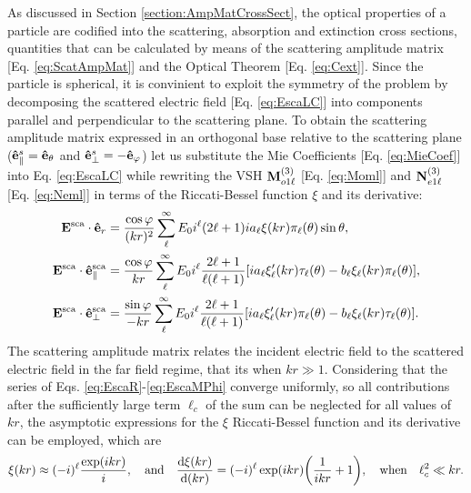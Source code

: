 As discussed in Section \ref{section:AmpMatCrossSect}, the optical properties of a particle are codified into the scattering, absorption and extinction cross sections, quantities that can be calculated by means of the scattering amplitude matrix [Eq. \eqref{eq:ScatAmpMat}] and the Optical Theorem [Eq. \eqref{eq:Cext}]. Since the particle is spherical, it is convinient to exploit the symmetry of the problem  by decomposing the scattered electric field [Eq. \eqref{eq:EscaLC}] into components parallel and perpendicular to the scattering plane. To obtain the scattering amplitude matrix  expressed in an orthogonal base relative to the scattering plane ($\vu{e}_\parallel^s =\vu{e}_\theta$ and $\vu{e}_\perp^s=-\vu{e}_\varphi$) let us substitute the Mie Coefficients [Eq. \eqref{eq:MieCoef}] into Eq. \eqref{eq:EscaLC}  while rewriting the VSH $\vb{M}^{(3)}_{o1\ell}$  [Eq. \eqref{eq:Moml}] and $\vb{N}^{(3)}_{e1\ell}$ [Eq. \eqref{eq:Neml}] in terms of the Riccati-Bessel function  $\xi$ and its derivative:
%
\begin{align}
\vb{E}^\text{sca}\cdot\vu{e}_r &=  \frac{\cos\varphi}{(kr)^2}
								\sum_\ell^\infty E_0i^\ell(2\ell+1)
								ia_\ell \xi(kr)\pi_\ell(\theta) \sin\theta ,
\label{eq:EscaR}\\
\vb{E}^\text{sca}\cdot\vu{e}^\text{sca}_\parallel &=  \frac{\cos\varphi}{kr}
								\sum_\ell^\infty E_0i^\ell\frac{2\ell+1}{\ell(\ell+1)}
						[i a_\ell\xi_\ell'(kr)\tau_\ell(\theta)-b_\ell\xi_\ell(kr)\pi_\ell(\theta)],
\label{eq:EscaTheta}\\
\vb{E}^\text{sca}\cdot\vu{e}^\text{sca}_\perp &=  \frac{\sin\varphi}{-kr}
								\sum_\ell^\infty E_0i^\ell\frac{2\ell+1}{\ell(\ell+1)}
						[i a_\ell\xi_\ell'(kr)\pi_\ell(\theta)-b_\ell\xi_\ell(kr)\tau_\ell(\theta)].
\label{eq:EscaMPhi}
\end{align}
%
The scattering amplitude matrix relates the incident electric field to the scattered electric field in the far field regime, that its when $kr\gg 1$. Considering that the series of Eqs. \eqref{eq:EscaR}-\eqref{eq:EscaMPhi} converge uniformly, so all contributions after the sufficiently large  term $\ell_c$ of the sum can be neglected for all values of $kr$, the asymptotic  expressions for the $\xi$ Riccati-Bessel function and its derivative can be employed, which are \cite{bohren_absorption_1983}
%
\begin{align}
\xi(kr)\approx (-i)^\ell \frac{\exp(ikr)}{i},
\qqtext{and}
\dv{\xi(kr)}{(kr)} = (-i)^\ell \exp(ikr)\qty(\frac{1}{i kr} + 1),
\qqtext{when}
\ell_c^2\ll kr.
\label{eq:RBXiAssym}
\end{align}
%

